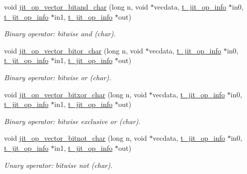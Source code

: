 \begin{DoxyCompactItemize}
void \hyperlink{group__opvecmod_ga06089d7ed6a436ec5b392fa5de518efd}{jit\_\-op\_\-vector\_\-bitand\_\-char} (long n, void $\ast$vecdata, \hyperlink{structt__jit__op__info}{t\_\-jit\_\-op\_\-info} $\ast$in0, \hyperlink{structt__jit__op__info}{t\_\-jit\_\-op\_\-info} $\ast$in1, \hyperlink{structt__jit__op__info}{t\_\-jit\_\-op\_\-info} $\ast$out)
\begin{DoxyCompactList}\small\item\em Binary operator: bitwise and (char). \item\end{DoxyCompactList}\item 
void \hyperlink{group__opvecmod_ga83500ff0d582205c900648a0cf2de281}{jit\_\-op\_\-vector\_\-bitor\_\-char} (long n, void $\ast$vecdata, \hyperlink{structt__jit__op__info}{t\_\-jit\_\-op\_\-info} $\ast$in0, \hyperlink{structt__jit__op__info}{t\_\-jit\_\-op\_\-info} $\ast$in1, \hyperlink{structt__jit__op__info}{t\_\-jit\_\-op\_\-info} $\ast$out)
\begin{DoxyCompactList}\small\item\em Binary operator: bitwise or (char). \item\end{DoxyCompactList}\item 
void \hyperlink{group__opvecmod_ga111c6eea3e8f091ca2e18b1f4a447673}{jit\_\-op\_\-vector\_\-bitxor\_\-char} (long n, void $\ast$vecdata, \hyperlink{structt__jit__op__info}{t\_\-jit\_\-op\_\-info} $\ast$in0, \hyperlink{structt__jit__op__info}{t\_\-jit\_\-op\_\-info} $\ast$in1, \hyperlink{structt__jit__op__info}{t\_\-jit\_\-op\_\-info} $\ast$out)
\begin{DoxyCompactList}\small\item\em Binary operator: bitwise exclusive or (char). \item\end{DoxyCompactList}\item 
void \hyperlink{group__opvecmod_ga041bdada970cd8a0b999df5ebfbea61b}{jit\_\-op\_\-vector\_\-bitnot\_\-char} (long n, void $\ast$vecdata, \hyperlink{structt__jit__op__info}{t\_\-jit\_\-op\_\-info} $\ast$in0, \hyperlink{structt__jit__op__info}{t\_\-jit\_\-op\_\-info} $\ast$in1, \hyperlink{structt__jit__op__info}{t\_\-jit\_\-op\_\-info} $\ast$out)
\begin{DoxyCompactList}\small\item\em Unary operator: bitwise not (char). \item\end{DoxyCompactList}\item 

\end{DoxyCompactItemize}

